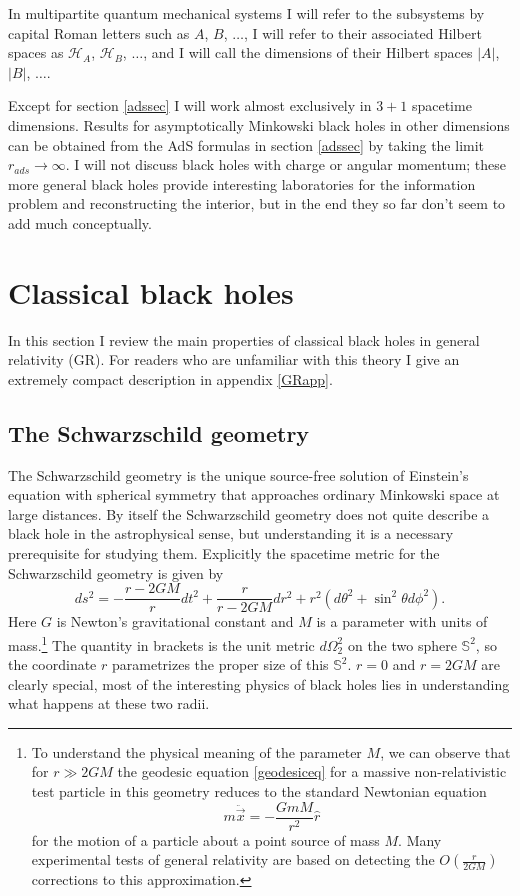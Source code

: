 \documentclass[12pt]{article}
\newcommand{\be}{\begin{equation}}
\newcommand{\ee}{\end{equation}}
\newcommand{\HA}{\mathcal{H}_A}
\newcommand{\HB}{\mathcal{H}_B}
\begin{document}
In multipartite quantum mechanical systems I will refer to the subsystems by capital Roman letters such as $A$, $B$, $\ldots$, I will refer to their associated Hilbert spaces as $\HA$, $\HB$, $\ldots$, and I will call the dimensions of their Hilbert spaces $|A|$, $|B|$, $\ldots$.  

Except for section \ref{adssec} I will work almost exclusively in $3+1$ spacetime dimensions.  Results for asymptotically Minkowski black holes in other dimensions can be obtained from the AdS formulas in section \ref{adssec} by taking the limit $r_{ads}\to\infty$.  I will not discuss black holes with charge or angular momentum; these more general black holes provide interesting laboratories for the information problem and reconstructing the interior, but in the end they so far don't seem to add much conceptually. 

\section{Classical black holes}\label{clbhsec}

In this section I review the main properties of classical black holes in general relativity (GR).  For readers who are unfamiliar with this theory I give an extremely compact description in appendix \ref{GRapp}.
\subsection{The Schwarzschild geometry}\label{schgsec}
The Schwarzschild geometry is the unique source-free solution of Einstein's equation with spherical symmetry that approaches ordinary Minkowski space at large distances.  By itself the Schwarzschild geometry does not quite describe a black hole in the astrophysical sense, but understanding it is a necessary prerequisite for studying them.  Explicitly the spacetime metric for the Schwarzschild geometry is given by
\be\label{schmet}
ds^2=-\frac{r-2GM}{r}dt^2+\frac{r}{r-2GM} dr^2+r^2 (d\theta^2+\sin^2\theta d\phi^2).
\ee
Here $G$ is Newton's gravitational constant and $M$ is a parameter with units of mass.\footnote{To understand the physical meaning of the parameter $M$, we can observe that for $r\gg 2GM$ the geodesic equation \eqref{geodesiceq} for a massive non-relativistic test particle in this geometry reduces to the standard Newtonian equation
\be
m\ddot{\vec{x}}=-\frac{Gm M}{r^2}\hat{r}
\ee
for the motion of a particle about a point source of mass $M$.  Many experimental tests of general relativity are based on detecting the $O\left(\frac{r}{2GM}\right)$ corrections to this approximation.}
The quantity in brackets is the unit metric $d\Omega_2^2$ on the two sphere $\mathbb{S}^2$, so the coordinate $r$ parametrizes the proper size of this $\mathbb{S}^2$.  $r=0$ and $r=2GM$ are clearly special, most of the interesting physics of black holes lies in understanding what happens at these two radii.  
\end{document}
